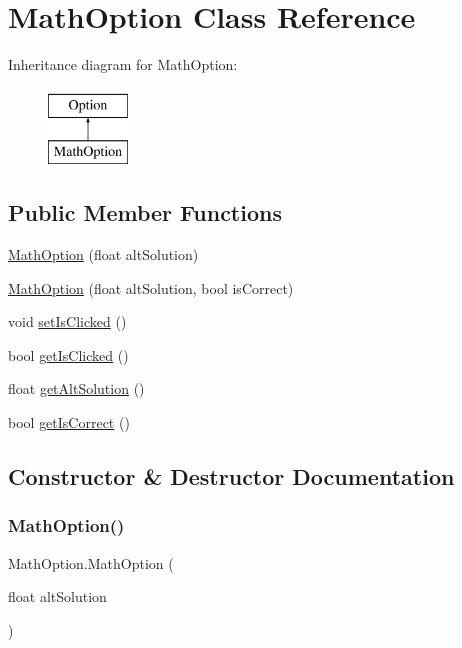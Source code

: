 \hypertarget{classMathOption}{}\section{Math\+Option Class Reference}
\label{classMathOption}
Inheritance diagram for Math\+Option\+:\begin{figure}[H]
\begin{center}
\leavevmode
\includegraphics[height=2.000000cm]{classMathOption}
\end{center}
\end{figure}
\subsection*{Public Member Functions}
\begin{DoxyCompactItemize}
\item 
\hyperlink{classMathOption_ad20c58e84e628cd0f507b3de604af9ad}{Math\+Option} (float alt\+Solution)
\item 
\hyperlink{classMathOption_aba68a74bb6ac7fd68d4475138ec14ad6}{Math\+Option} (float alt\+Solution, bool is\+Correct)
\item 
void \hyperlink{classMathOption_a08e458e3fb9a8e94c8116e42febc85bb}{set\+Is\+Clicked} ()
\item 
bool \hyperlink{classMathOption_a08e5f3127a377551d658f83967125998}{get\+Is\+Clicked} ()
\item 
float \hyperlink{classMathOption_abfcef5356a44a10d7c43729b49131bba}{get\+Alt\+Solution} ()
\item 
bool \hyperlink{classMathOption_aaa591898e3b2f7fc10051ffeb8b7f504}{get\+Is\+Correct} ()
\end{DoxyCompactItemize}


\subsection{Constructor \& Destructor Documentation}
\mbox{\label{classMathOption_ad20c58e84e628cd0f507b3de604af9ad}} 
\subsubsection{\texorpdfstring{Math\+Option()}{MathOption()}\hspace{0.1cm}{\footnotesize\ttfamily [1/2]}}
{\footnotesize\ttfamily Math\+Option.\+Math\+Option (\begin{DoxyParamCaption}\item[{float}]{alt\+Solution }\end{DoxyParamCaption})\hspace{0.3cm}{\ttfamily [inline]}}

